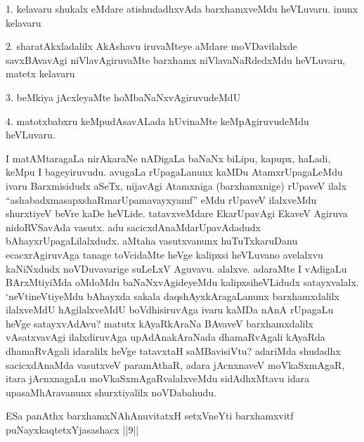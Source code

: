 \begin{artha}
1. kelavaru shukalx eMdare atishudadhxvAda barxhamxveMdu heVLuvaru. inunx kelavaru

2. sharatAkxladalilx AkAshavu iruvaMteye aMdare moVDavilalxde savxBAvavAgi niVlavAgiruvaMte barxhamx niVlavaNaRdedxMdu heVLuvaru, matetx kelavaru 

3. beMkiya jAcxleyaMte hoMbaNaNxvAgiruvudeMdU

4. matotxbabxru keMpudAsavALada hUvinaMte keMpAgiruvudeMdu heVLuvaru.

I matAMtaragaLa nirAkaraNe \ndash  nADigaLa baNaNx biLipu, kapupx, haLadi, keMpu I bageyiruvudu. avugaLa rUpagaLanunx kaMDu AtamxrUpagaLeMdu ivaru Barxmisidudx aSeTx, nijavAgi Atamxniga (barxhamxnige) rUpaveV ilalx ``ashabadxmasapxshaRmarUpamavayxyamf'' eMdu rUpaveV ilalxveMdu shurxtiyeV beVre kaDe heVLide. tatavxveMdare EkarUpavAgi EkaveV Agiruva nidoRVSavAda vasutx. adu sacicxdAnaMdarUpavAdadudx bAhayxrUpagaLilalxdudx. aMtaha vasutxvanunx huTuTxkaruDanu ecacxrAgiruvAga tanage toVcidaMte heVge kalipxsi heVLuvano avelalxvu kaNiNxdudx noVDuvavarige suLeLxV Aguvavu. alalxve. adaraMte I vAdigaLu BArxMtiyiMda oMdoMdu baNaNxvAgideyeMdu kalipxsiheVLidudx satayxvalalx. `neVtineVtiyeMdu bAhayxda sakala daqshAyxkAragaLanunx barxhamxdalilx ilalxveMdU hAgilalxveMdU boVdhisiruvAga ivaru kaMDa nAnA rUpagaLu heVge satayxvAdAvu? matutx kAyaRkAraNa BAvaveV barxhamxdalilx vAsatxvavAgi ilalxdiruvAga upAdAnakAraNada dhamaRvAgali kAyaRda dhamaRvAgali idaralilx heVge tatavxtaH saMBavisiVtu? adariMda shudadhx sacicxdAnaMda vasutxveV paramAthaR, adara jAcnxnaveV moVkaSxmAgaR, itara jAcnxnagaLu moVkaSxmAgaRvalalxveMdu sidAdhxMtavu \ndash  idara upasaMhAravanunx shurxtiyalilx noVDabahudu.
\end{artha}

\begin{shl}
ESa panAthx barxhamxNAhAnuvitatxH setxVneYti barxhamxvitf puNayxkaqtetxYjasashacx ||9||
\end{shl}

